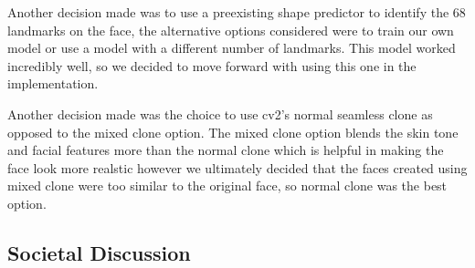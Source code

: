 Another decision made was to use a preexisting shape predictor to identify the 68 landmarks on the face, the alternative options
considered were to train our own model or use a model with a different number of landmarks. This model worked incredibly well, so
we decided to move forward with using this one in the implementation.

Another decision made was the choice to use cv2's normal seamless clone as opposed to the mixed clone option. The mixed clone option
blends the skin tone and facial features more than the normal clone which is helpful in making the face look more realstic
however we ultimately decided that the faces created using mixed clone were too similar to the original face, so normal
clone was the best option.

\subsection{Societal Discussion}


